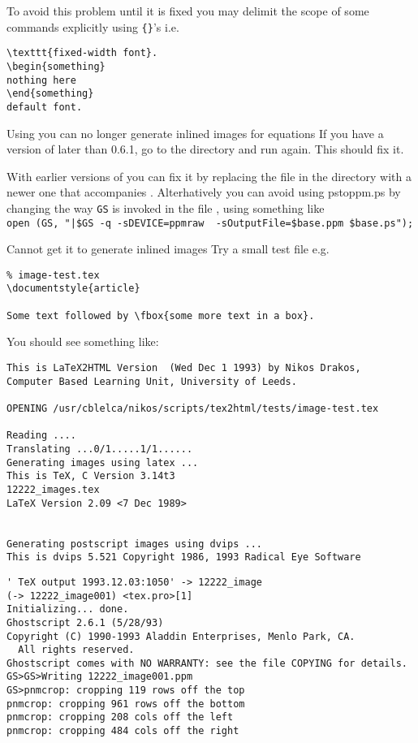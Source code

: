 \begin{htmllist}
To avoid this problem until it is fixed you may delimit the scope of
some
commands explicitly using \verb|{}|'s i.e.
\begin{verbatim}
\texttt{fixed-width font}.
\begin{something}
nothing here
\end{something}
default font.
\end{verbatim}

\item [Using \fn{Ghostscript 3.X} you can no
longer generate inlined images for equations]
If you have a version of \latextohtml{} later than 0.6.1, go to the
\latextohtml{} directory and run  again. This should 
fix it.

With earlier versions of \latextohtml{} you can fix it by 
replacing the file  in the 
\latextohtml{} directory with a newer one that accompanies 
. Alterhatively you can avoid using {\fn
pstoppm.ps} 
by changing the way \texttt{GS} is invoked in the file ,
using something like \\
\verb/open (GS, "|$GS -q -sDEVICE=ppmraw  -sOutputFile=$base.ppm $base.ps");/

\item [Cannot get it to generate inlined images]
Try a small test file e.g.
\begin{verbatim}
% image-test.tex
\documentstyle{article}

Some text followed by \fbox{some more text in a box}.

\end{verbatim}

You should see something like:
\begin{verbatim}
This is LaTeX2HTML Version  (Wed Dec 1 1993) by Nikos Drakos, 
Computer Based Learning Unit, University of Leeds.

OPENING /usr/cblelca/nikos/scripts/tex2html/tests/image-test.tex 

Reading ....
Translating ...0/1.....1/1......
Generating images using latex ...
This is TeX, C Version 3.14t3
12222_images.tex
LaTeX Version 2.09 <7 Dec 1989>


Generating postscript images using dvips ...
This is dvips 5.521 Copyright 1986, 1993 Radical Eye Software
\end{verbatim}
\begin{verbatim}
' TeX output 1993.12.03:1050' -> 12222_image
(-> 12222_image001) <tex.pro>[1] 
Initializing... done.
Ghostscript 2.6.1 (5/28/93)
Copyright (C) 1990-1993 Aladdin Enterprises, Menlo Park, CA.
  All rights reserved.
Ghostscript comes with NO WARRANTY: see the file COPYING for details.
GS>GS>Writing 12222_image001.ppm
GS>pnmcrop: cropping 119 rows off the top
pnmcrop: cropping 961 rows off the bottom
pnmcrop: cropping 208 cols off the left
pnmcrop: cropping 484 cols off the right


\end{verbatim}
\end{htmllist}
